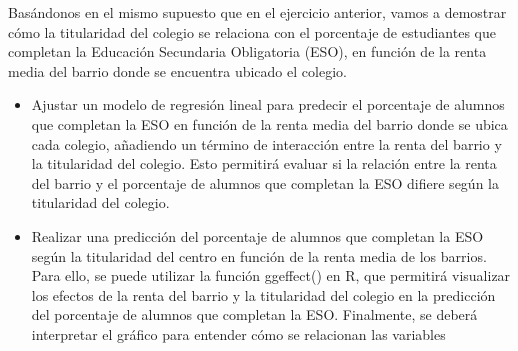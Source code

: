 \documentclass[
]{article}
\begin{document}
Basándonos en el mismo supuesto que en el ejercicio anterior, vamos a
demostrar cómo la titularidad del colegio se relaciona con el porcentaje
de estudiantes que completan la Educación Secundaria Obligatoria (ESO),
en función de la renta media del barrio donde se encuentra ubicado el
colegio.

\begin{itemize}
\item
  Ajustar un modelo de regresión lineal para predecir el porcentaje de
  alumnos que completan la ESO en función de la renta media del barrio
  donde se ubica cada colegio, añadiendo un término de interacción entre
  la renta del barrio y la titularidad del colegio. Esto permitirá
  evaluar si la relación entre la renta del barrio y el porcentaje de
  alumnos que completan la ESO difiere según la titularidad del colegio.
\item
  Realizar una predicción del porcentaje de alumnos que completan la ESO
  según la titularidad del centro en función de la renta media de los
  barrios. Para ello, se puede utilizar la función ggeffect() en R, que
  permitirá visualizar los efectos de la renta del barrio y la
  titularidad del colegio en la predicción del porcentaje de alumnos que
  completan la ESO. Finalmente, se deberá interpretar el gráfico para
  entender cómo se relacionan las variables
\end{itemize}
\end{document}
